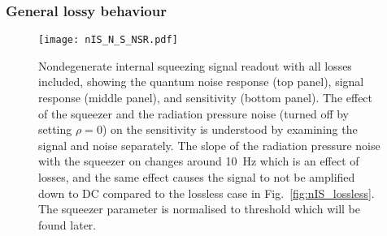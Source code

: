 \subsubsection{General lossy behaviour}
\label{sec:nIS_general_behaviour}

\begin{figure}
	\centering
	\texttt{[image: nIS\_N\_S\_NSR.pdf]}
	\caption{  Nondegenerate internal squeezing signal readout with all losses included, showing the quantum noise response (top panel), signal response (middle panel), and sensitivity (bottom panel). The effect of the squeezer and the radiation pressure noise (turned off by setting $\rho=0$) on the sensitivity is understood by examining the signal and noise separately. The slope of the radiation pressure noise with the squeezer on changes around 10~Hz which is an effect of losses, and the same effect causes the signal to not be amplified down to DC compared to the lossless case in Fig.~\ref{fig:nIS_lossless}. The squeezer parameter is normalised to threshold which will be found later.}
	\label{fig:nIS_general_sens}
\end{figure}

